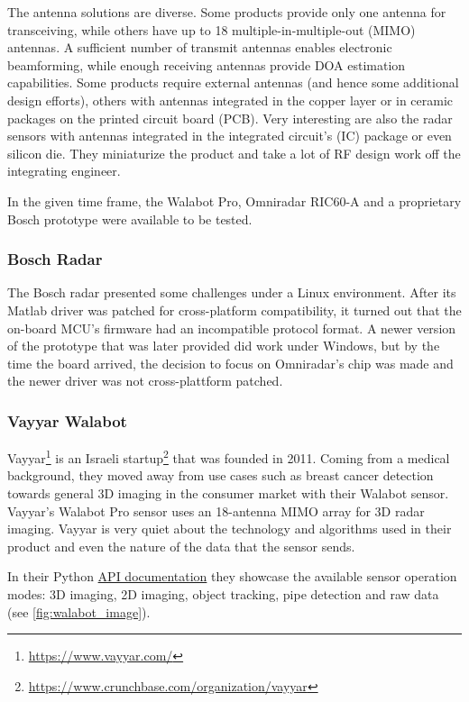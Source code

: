 

The antenna solutions are diverse. Some products provide only one antenna for transceiving, while others have up to 18 multiple-in-multiple-out (MIMO) antennas. A sufficient number of transmit antennas enables electronic beamforming, while enough receiving antennas provide DOA estimation capabilities. Some products require external antennas (and hence some additional design efforts), others with antennas integrated in the copper layer or in ceramic packages on the printed circuit board (PCB). Very interesting are also the radar sensors with antennas integrated in the integrated circuit's (IC) package or even silicon die. They miniaturize the product and take a lot of RF design work off the integrating engineer.

In the given time frame, the Walabot Pro, Omniradar RIC60-A and a proprietary Bosch prototype were available to be tested.

\subsubsection{Bosch Radar}\label{bosch-radar}

The Bosch radar presented some challenges under a Linux environment. After its Matlab driver was patched for cross-platform compatibility, it turned out that the on-board MCU's firmware had an incompatible protocol format. A newer version of the prototype that was later provided did work under Windows, but by the time the board arrived, the decision to focus on Omniradar's chip was made and the newer driver was not cross-plattform patched.

\subsubsection{Vayyar Walabot}\label{walabot}

Vayyar\footnote{\url{https://www.vayyar.com/}} is an Israeli
startup\footnote{\url{https://www.crunchbase.com/organization/vayyar}} that was founded in 2011. Coming from a medical background, they moved away from use cases such as breast cancer detection towards general 3D imaging in the consumer market with their Walabot sensor. Vayyar's Walabot Pro sensor uses an 18-antenna MIMO array for 3D radar imaging. Vayyar is very quiet about the technology and algorithms used in their product and even the nature of the data that the sensor sends.

In their Python \href{https://api.walabot.com}{API documentation} they showcase the available sensor operation modes: 3D imaging, 2D imaging, object tracking, pipe detection and raw data (see \cref{fig:walabot_image}).


